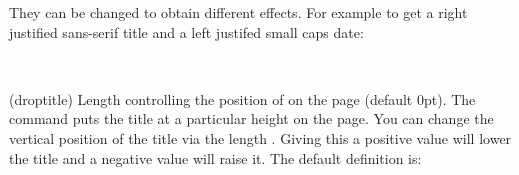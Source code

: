 They can be changed to obtain different effects. For example to get
a right justified sans-serif title and a left justifed small caps
date:
\begin{lcode}
\pretitle{\begin{flushright}\LARGE\sffamily}
\posttitle{\par\end{flushright}\vskip 0.5em}
\predate{\begin{flushleft}\large\scshape}
\postdate{\par\end{flushleft}}
\end{lcode}

\begin{syntax}
\lnc{\droptitle} \\
\end{syntax}
\glossary(droptitle)%
  {}%
  {Length controlling the position of  on the page (default 0pt).}
 The \cmd{\maketitle} command puts the title at a particular height on the 
page. 
 You can change the vertical position of the title via the length
\lnc{\droptitle}. Giving this a positive value will lower the title and a
negative value will raise it. The default definition is: 
\begin{lcode}
\setlength{\droptitle}{0pt}
\end{lcode}

